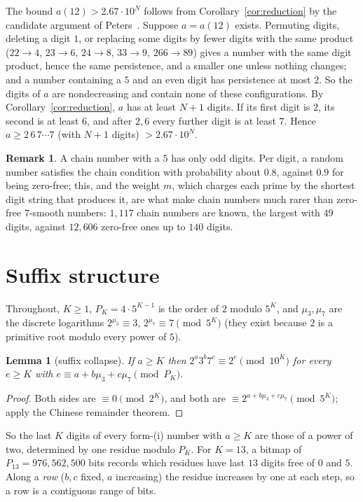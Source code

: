 \documentclass[11pt]{article}
\newtheorem{lemma}[theorem]{Lemma}
\theoremstyle{definition}
\newtheorem{remark}[theorem]{Remark}
\begin{document}
The bound $a(12)>2.67\cdot10^{N}$ follows from Corollary~\ref{cor:reduction} by the candidate argument of
Peters~\cite{peters}. Suppose $a=a(12)$ exists. Permuting digits, deleting a digit $1$, or replacing some digits by
fewer digits with the same product ($22\to4$, $23\to6$, $24\to8$, $33\to9$, $266\to89$) gives a number with the same
digit product, hence the same persistence, and a smaller one unless nothing changes; and a number containing a $5$
and an even digit has persistence at most $2$. So the digits of $a$ are nondecreasing and contain none of these
configurations. By Corollary~\ref{cor:reduction}, $a$ has at least $N+1$ digits. If its first digit is $2$, its second
is at least $6$, and after $2,6$ every further digit is at least $7$. Hence
$a\ge 2\,6\,7\cdots7$ (with $N+1$ digits) $>2.67\cdot10^{N}$.

\begin{remark}
A chain number with a $5$ has only odd digits. Per digit, a random number satisfies the chain condition with probability
about $0.8$, against $0.9$ for being zero-free; this, and the weight $m$, which charges each prime by the shortest digit
string that produces it, are what make chain numbers much rarer than zero-free $7$-smooth numbers: $1{,}117$ chain
numbers are known, the largest with $49$ digits, against $12{,}606$ zero-free ones up to $140$ digits.
\end{remark}

\section{Suffix structure}\label{sec:suffix}

Throughout, $K\ge1$, $P_K=4\cdot5^{K-1}$ is the order of $2$ modulo $5^K$, and $\mu_3,\mu_7$ are the discrete logarithms
$2^{\mu_3}\equiv3$, $2^{\mu_7}\equiv7\pmod{5^K}$ (they exist because $2$ is a primitive root modulo every power of $5$).

\begin{lemma}[suffix collapse]\label{lem:L1}
If $a\ge K$ then $2^a3^b7^c\equiv 2^e\pmod{10^K}$ for every $e\ge K$ with $e\equiv a+b\mu_3+c\mu_7\pmod{P_K}$.
\end{lemma}

\begin{proof}
Both sides are $\equiv0\pmod{2^K}$, and both are $\equiv 2^{a+b\mu_3+c\mu_7}\pmod{5^K}$; apply the Chinese remainder
theorem.
\end{proof}

So the last $K$ digits of every form-(i) number with $a\ge K$ are those of a power of two, determined by one residue
modulo $P_K$. For $K=13$, a bitmap of $P_{13}=976{,}562{,}500$ bits records which residues have last $13$ digits
free of $0$ and $5$. Along a \emph{row} ($b,c$ fixed, $a$ increasing) the residue increases by one at each step, so a
row is a contiguous range of bits.
\end{document}
